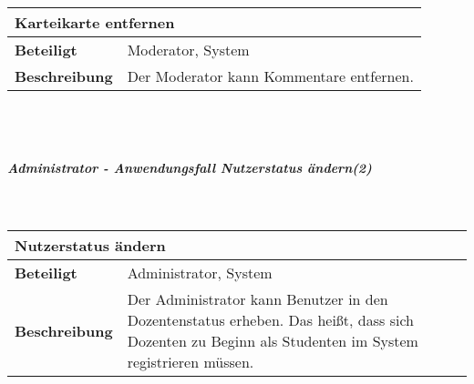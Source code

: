 \documentclass[12pt,a4paper]{article}
\begin{document}
\begin{tabular}{l p{10cm}}
\multicolumn{2}{l}{\textbf{Karteikarte entfernen}} \\ \hline
\textbf{Beteiligt} & Moderator, System \\ \hline 
\textbf{Beschreibung} & Der Moderator kann Kommentare entfernen.\\ 
\hline 
\end{tabular}\\\\
\subparagraph{Administrator - Anwendungsfall \glqq Nutzerstatus ändern\grqq (2)}\mbox{}\\

\begin{tabular}{l p{10cm}}
\multicolumn{2}{l}{\textbf{Nutzerstatus ändern}} \\ \hline
\textbf{Beteiligt} & Administrator, System \\ \hline 
\textbf{Beschreibung} & Der Administrator kann Benutzer in den Dozentenstatus erheben. Das heißt, dass sich Dozenten zu Beginn als Studenten im System registrieren müssen.\\ 
\hline 
\end{tabular}\\\\
\end{document}
